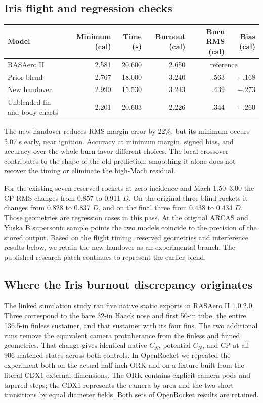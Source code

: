 \subsection*{Iris flight and regression checks}
\begin{center}\small\begin{tabular}{lrrrrr}\toprule
Model & Minimum (cal) & Time (s) & Burnout (cal) & Burn RMS (cal) & Bias (cal)\\\midrule
RASAero II &2.581&20.600&2.650&\multicolumn{2}{c}{reference}\\
Prior blend &2.767&18.000&3.240&.563&+.168\\
New handover&2.990&15.530&3.243&.439&+.273\\
Unblended fin and body charts&2.201&20.603&2.226&.344&$-$.260\\\bottomrule\end{tabular}\end{center}
The new handover reduces RMS margin error by 22\%, but its minimum occurs 5.07 s early, near ignition. Accuracy at minimum margin, signed bias, and accuracy over the whole burn favor different choices. The local crossover contributes to the shape of the old prediction; smoothing it alone does not recover the timing or eliminate the high-Mach residual.

For the existing seven reserved rockets at zero incidence and Mach 1.50--3.00 the CP RMS changes from 0.857 to 0.911 $D$. On the original three blind rockets it changes from 0.828 to 0.837 $D$, and on the final three from 0.438 to 0.434 $D$. Those geometries are regression cases in this pass. At the original ARCAS and Yuska B supersonic sample points the two models coincide to the precision of the stored output. Based on the flight timing, reserved geometries and interference results below, we retain the new handover as an experimental branch. The published research patch continues to represent the earlier blend.
\clearpage
\subsection*{Where the Iris burnout discrepancy originates}
The linked simulation study ran five native static exports in RASAero II 1.0.2.0. Three correspond to the bare 32-in Haack nose and first 50-in tube, the entire 136.5-in finless sustainer, and that sustainer with its four fins. The two additional runs remove the equivalent camera protuberance from the finless and finned geometries. That change gives identical native $C_N$, potential $C_N$, and CP at all 906 matched states across both controls. In OpenRocket we repeated the experiment both on the actual half-inch ORK and on a fixture built from the literal CDX1 external dimensions. The ORK contains explicit camera pods and tapered steps; the CDX1 represents the camera by area and the two short transitions by equal diameter fields. Both sets of OpenRocket results are retained.


